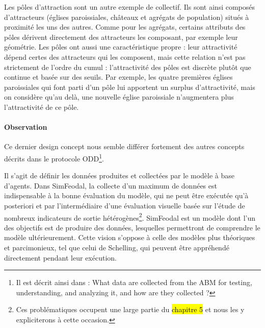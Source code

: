 Les pôles d'attraction sont un autre exemple de collectif.
Ils sont ainsi composés d'attracteurs (églises paroissiales, châteaux et agrégats de population) situés à proximité les uns des autres.
Comme pour les agrégats, certains attributs des pôles dérivent directement des attracteurs les composant, par exemple leur géométrie.
Les pôles ont aussi une caractéristique propre : leur attractivité dépend certes des attracteurs qui les composent, mais cette relation n'est pas strictement de l'ordre du cumul : l'attractivité des pôles est discrète plutôt que continue et basée sur des seuils.
Par exemple, les quatre premières églises paroissiales qui font parti d'un pôle lui apportent un surplus d'attractivité, mais on considère qu'au delà, une nouvelle église paroissiale n'augmentera plus l'attractivité de ce pôle.


\paragraph{Observation} Ce dernier \og design concept\fg{} nous semble différer fortement des autres concepts décrits dans le protocole ODD\footnote{
Il est décrit ainsi dans \textcite[354]{grimm_documenting_2017} :
\og What data are collected from the ABM for testing, understanding, and analyzing it, and how are they collected ? \fg{}
}.

Il s'agit de définir les données produites et collectées par le modèle à base d'agents.
Dans SimFeodal, la collecte d'un maximum de données est indispensable à la bonne évaluation du modèle, qui ne peut être exécutée qu'à posteriori et par l'intermédiaire d'une \og évaluation visuelle\fg{} basée sur l'étude de nombreux indicateurs de sortie hétérogènes\footnote{
	Ces problématiques occupent une large partie du \hl{chapitre 5} et nous les y expliciterons à cette occasion.
}.
SimFeodal est un modèle dont l'un des objectifs est de produire des données, lesquelles permettront de comprendre le modèle ultérieurement.
Cette vision s'oppose à celle des modèles plus théoriques et parcimonieux, tel que celui de Schelling, qui peuvent être appréhendé directement pendant leur exécution. 


\clearpage
\let\orisectionmark\sectionmark
\renewcommand\sectionmark[1]{}%
